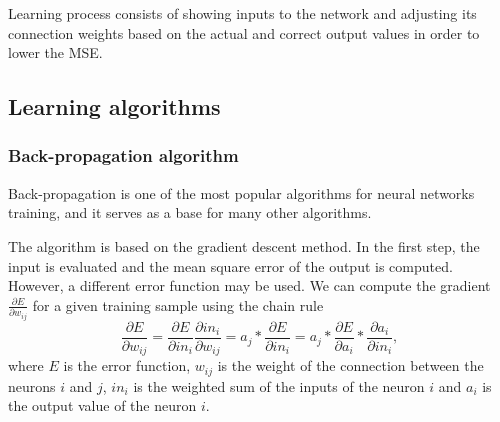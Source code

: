 Learning process consists of showing inputs to the network and adjusting its connection weights based on the actual and correct output values in order to lower the \textsc{MSE}.

\subsection{Learning algorithms}

\subsubsection{Back-propagation algorithm}
Back-propagation is one of the most popular algorithms for neural networks training, and it serves as a base for many other algorithms.

The algorithm is based on the gradient descent method. In the first step, the input is evaluated and the mean square error of the output is computed. However, a different error function may be used. We can compute the gradient $\frac{\partial E}{\partial w_{ij}}$ for a given training sample using the chain rule
\[
\frac{\partial E}{\partial w_{ij}} = \frac{\partial E}{\partial in_{i}} \frac{\partial in_{i}}{\partial w_{ij}} = 
a_{j}*\frac{\partial E}{\partial in_{i}} = a_{j}*\frac{\partial E}{\partial a_{i}}*\frac{\partial a_{i}}{\partial in_{i}},
\]
where $E$ is the error function, $w_{ij}$ is the weight of the connection between the neurons $i$ and $j$, $in_{i}$ is the weighted sum of the inputs of the neuron $i$ and $a_{i}$ is the output value of the neuron $i$.

